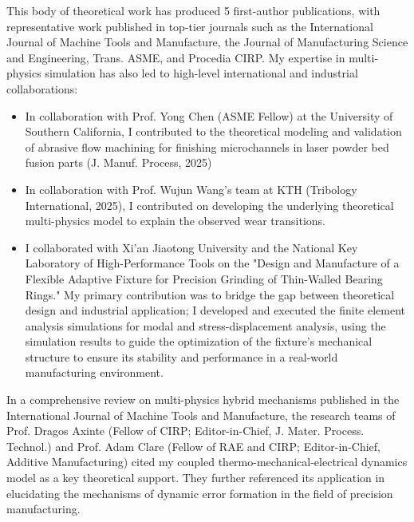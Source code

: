\documentclass{ResearchStatement}
\begin{document}
This body of theoretical work has produced 5 first-author publications, with representative work published in top-tier journals such as the International Journal of Machine Tools and Manufacture, the Journal of Manufacturing Science and Engineering, Trans. ASME, and Procedia CIRP. My expertise in multi-physics simulation has also led to high-level international and industrial collaborations:
\begin{itemize}
    \item In collaboration with Prof. Yong Chen (ASME Fellow) at the University of Southern California, I contributed to the theoretical modeling and validation of abrasive flow machining for finishing microchannels in laser powder bed fusion parts (J. Manuf. Process, 2025)
    \item In collaboration with Prof. Wujun Wang's team at KTH (Tribology International, 2025), I contributed on developing the underlying theoretical multi-physics model to explain the observed wear transitions.
    \item I collaborated with Xi'an Jiaotong University and the National Key Laboratory of High-Performance Tools on the "Design and Manufacture of a Flexible Adaptive Fixture for Precision Grinding of Thin-Walled Bearing Rings." My primary contribution was to bridge the gap between theoretical design and industrial application; I developed and executed the finite element analysis simulations for modal and stress-displacement analysis, using the simulation results to guide the optimization of the fixture's mechanical structure to ensure its stability and performance in a real-world manufacturing environment.
\end{itemize}
In a comprehensive review on multi-physics hybrid mechanisms published in the International Journal of Machine Tools and Manufacture, the research teams of Prof. Dragos Axinte (Fellow of CIRP; Editor-in-Chief, J. Mater. Process. Technol.) and Prof. Adam Clare (Fellow of RAE and CIRP; Editor-in-Chief, Additive Manufacturing) cited my coupled thermo-mechanical-electrical dynamics model as a key theoretical support. They further referenced its application in elucidating the mechanisms of dynamic error formation in the field of precision manufacturing.

\noindent\makebox[\textwidth][c]{%
    \centering
    
}
\begingroup
{}
\label{fig:citation_simulation}
\endgroup
\end{document}
